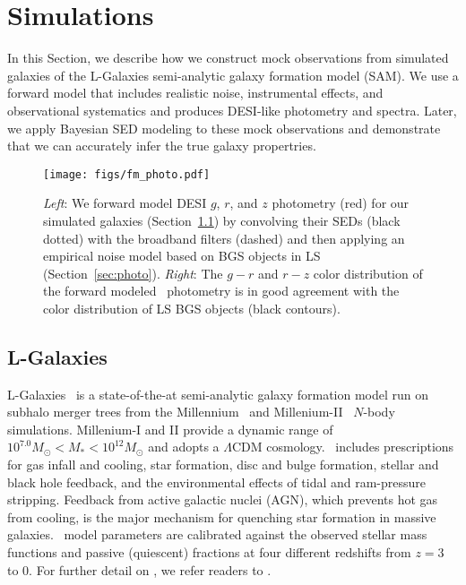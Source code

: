 \section{Simulations}\label{sec:sims}
In this Section, we describe how we construct mock observations from simulated
galaxies of the {\sc L-Galaxies} semi-analytic galaxy formation model (SAM).
We use a forward model that includes realistic noise, instrumental effects, and
observational systematics and produces DESI-like photometry and spectra. 
Later, we apply Bayesian SED modeling to these mock observations and
demonstrate that we can accurately infer the true galaxy propertries.

\begin{figure}
\begin{center}
\texttt{[image: figs/fm\_photo.pdf]}
\caption{{\em Left}: We forward model DESI $g$, $r$, and $z$ photometry (red)
    for our simulated galaxies (Section~\ref{sec:lgal}) by convolving their
    SEDs (black dotted) with the broadband filters (dashed) and then applying
    an empirical noise model based on BGS objects in LS
    (Section~\ref{sec:photo}).
    {\em Right}: The $g-r$ and $r-z$ color distribution of the forward modeled
    \lgal~photometry is in good agreement with the color distribution of LS BGS
    objects (black contours).} \label{fig:photo}
\end{center}
\end{figure}

\subsection{L-Galaxies} \label{sec:lgal}
{\sc L-Galaxies}~\citep[hereafter \lgal;][]{henriques2015} is a state-of-the-at
semi-analytic galaxy formation model run on subhalo merger trees from the
Millennium~\citep{springel2005a} and Millenium-II~\citep{boylan-kolchin2009}
$N$-body simulations. 
Millenium-I and II provide a dynamic range of $10^{7.0} M_\odot < M_* < 10^{12}
M_\odot$ and adopts a \cite{planckcollaboration2014a} $\Lambda$CDM cosmology.
\lgal~includes prescriptions for gas infall and cooling, star formation, disc
and bulge formation, stellar and black hole feedback, and the environmental
effects of tidal and ram-pressure stripping.
Feedback from active galactic nuclei (AGN), which prevents hot gas from
cooling, is the major mechanism for quenching star formation in massive
galaxies.
\lgal~model parameters are calibrated against the observed stellar mass
functions and passive (quiescent) fractions at four different redshifts from 
$z = 3$ to 0.
For further detail on \lgal, we refer readers to \cite{henriques2015}. 

